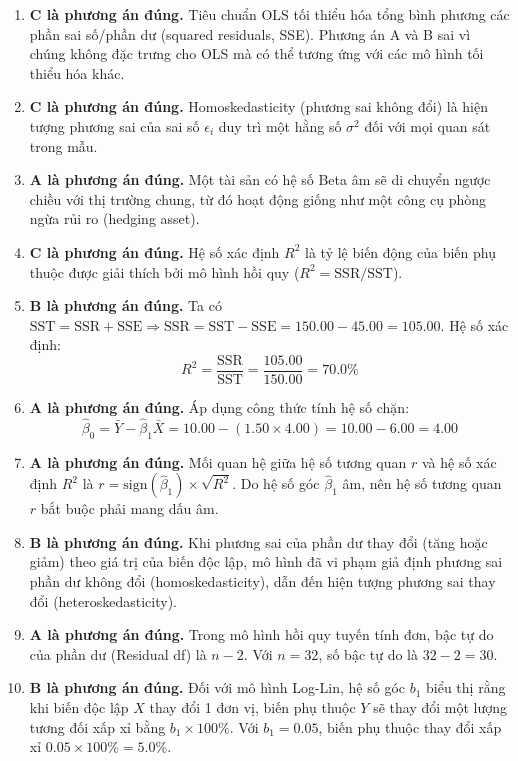 \begin{enumerate}
	\item \textbf{C là phương án đúng.} Tiêu chuẩn OLS tối thiểu hóa tổng bình phương các phần sai số/phần dư (squared residuals, SSE). Phương án A và B sai vì chúng không đặc trưng cho OLS mà có thể tương ứng với các mô hình tối thiểu hóa khác.
	
	\item \textbf{C là phương án đúng.} Homoskedasticity (phương sai không đổi) là hiện tượng phương sai của sai số $\epsilon_i$ duy trì một hằng số $\sigma^2$ đối với mọi quan sát trong mẫu.
	
	\item \textbf{A là phương án đúng.} Một tài sản có hệ số Beta âm sẽ di chuyển ngược chiều với thị trường chung, từ đó hoạt động giống như một công cụ phòng ngừa rủi ro (hedging asset).
	
	\item \textbf{C là phương án đúng.} Hệ số xác định $R^2$ là tỷ lệ biến động của biến phụ thuộc được giải thích bởi mô hình hồi quy ($R^2 = \text{SSR}/\text{SST}$).
	
	\item \textbf{B là phương án đúng.}
	      Ta có $\text{SST} = \text{SSR} + \text{SSE} \Rightarrow \text{SSR} = \text{SST} - \text{SSE} = 150.00 - 45.00 = 105.00$.
	      Hệ số xác định:
	      \[ R^2 = \frac{\text{SSR}}{\text{SST}} = \frac{105.00}{150.00} = 70.0\% \]
	      
	\item \textbf{A là phương án đúng.}
	      Áp dụng công thức tính hệ số chặn:
	      \[ \hat{\beta}_0 = \bar{Y} - \hat{\beta}_1 \bar{X} = 10.00 - (1.50 \times 4.00) = 10.00 - 6.00 = 4.00 \]
	      
	\item \textbf{A là phương án đúng.}
	      Mối quan hệ giữa hệ số tương quan $r$ và hệ số xác định $R^2$ là $r = \text{sign}(\hat{\beta}_1) \times \sqrt{R^2}$. Do hệ số góc $\hat{\beta}_1$ âm, nên hệ số tương quan $r$ bắt buộc phải mang dấu âm.
	      
	\item \textbf{B là phương án đúng.}
	      Khi phương sai của phần dư thay đổi (tăng hoặc giảm) theo giá trị của biến độc lập, mô hình đã vi phạm giả định phương sai phần dư không đổi (homoskedasticity), dẫn đến hiện tượng phương sai thay đổi (heteroskedasticity).
	      
	\item \textbf{A là phương án đúng.}
	      Trong mô hình hồi quy tuyến tính đơn, bậc tự do của phần dư (Residual df) là $n - 2$. Với $n = 32$, số bậc tự do là $32 - 2 = 30$.
	      
	\item \textbf{B là phương án đúng.}
	      Đối với mô hình Log-Lin, hệ số góc $b_1$ biểu thị rằng khi biến độc lập $X$ thay đổi 1 đơn vị, biến phụ thuộc $Y$ sẽ thay đổi một lượng tương đối xấp xỉ bằng $b_1 \times 100\%$. Với $b_1 = 0.05$, biến phụ thuộc thay đổi xấp xỉ $0.05 \times 100\% = 5.0\%$.
\end{enumerate}

